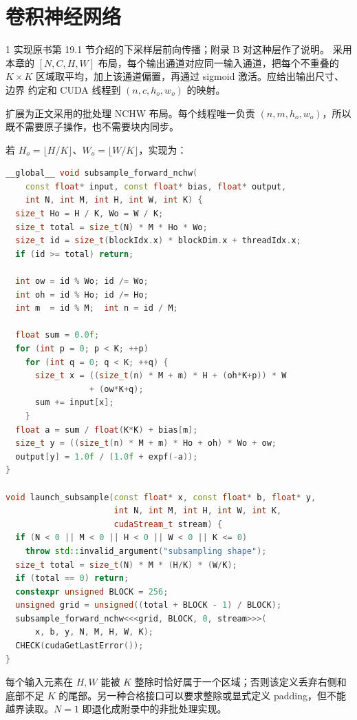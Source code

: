 \chapter{卷积神经网络}

\begin{solutionexercise}{1}
\problemheading 实现原书第 19.1 节介绍的下采样层前向传播；附录 B 对这种层作了说明。
采用本章的 $[N,C,H,W]$ 布局，每个输出通道对应同一输入通道，把每个不重叠的
$K\times K$ 区域取平均，加上该通道偏置，再通过 sigmoid 激活。应给出输出尺寸、边界
约定和 CUDA 线程到 $(n,c,h_o,w_o)$ 的映射。

\approachheading 扩展为正文采用的批处理 NCHW 布局。每个线程唯一负责
$(n,m,h_o,w_o)$，所以既不需要原子操作，也不需要块内同步。

\answerheading 若 $H_o=\lfloor H/K\rfloor$、$W_o=\lfloor W/K\rfloor$，实现为：
\begin{lstlisting}[language=C++]
__global__ void subsample_forward_nchw(
    const float* input, const float* bias, float* output,
    int N, int M, int H, int W, int K) {
  size_t Ho = H / K, Wo = W / K;
  size_t total = size_t(N) * M * Ho * Wo;
  size_t id = size_t(blockIdx.x) * blockDim.x + threadIdx.x;
  if (id >= total) return;

  int ow = id % Wo; id /= Wo;
  int oh = id % Ho; id /= Ho;
  int m  = id % M;  int n = id / M;

  float sum = 0.0f;
  for (int p = 0; p < K; ++p)
    for (int q = 0; q < K; ++q) {
      size_t x = ((size_t(n) * M + m) * H + (oh*K+p)) * W
                 + (ow*K+q);
      sum += input[x];
    }
  float a = sum / float(K*K) + bias[m];
  size_t y = ((size_t(n) * M + m) * Ho + oh) * Wo + ow;
  output[y] = 1.0f / (1.0f + expf(-a));
}

void launch_subsample(const float* x, const float* b, float* y,
                      int N, int M, int H, int W, int K,
                      cudaStream_t stream) {
  if (N < 0 || M < 0 || H < 0 || W < 0 || K <= 0)
    throw std::invalid_argument("subsampling shape");
  size_t total = size_t(N) * M * (H/K) * (W/K);
  if (total == 0) return;
  constexpr unsigned BLOCK = 256;
  unsigned grid = unsigned((total + BLOCK - 1) / BLOCK);
  subsample_forward_nchw<<<grid, BLOCK, 0, stream>>>(
      x, b, y, N, M, H, W, K);
  CHECK(cudaGetLastError());
}
\end{lstlisting}
每个输入元素在 $H,W$ 能被 $K$ 整除时恰好属于一个区域；否则该定义丢弃右侧和底部不足
$K$ 的尾部。另一种合格接口可以要求整除或显式定义 padding，但不能越界读取。$N=1$
即退化成附录中的非批处理实现。


\end{solutionexercise}
